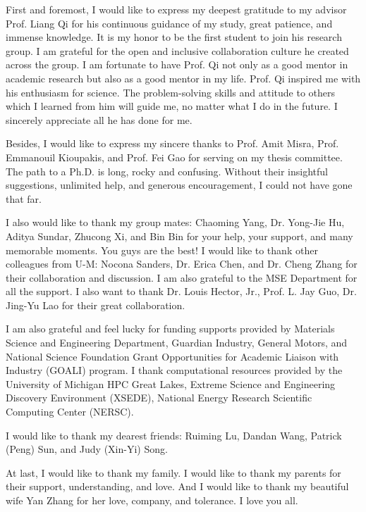 First and foremost, I would like to express my deepest gratitude to my advisor Prof. Liang Qi for his continuous guidance of my study, great patience, and immense knowledge. It is my honor to be the first student to join his research group. I am grateful for the open and inclusive collaboration culture he created across the group. I am fortunate to have Prof. Qi not only as a good mentor in academic research but also as a good mentor in my life. Prof. Qi inspired me with his enthusiasm for science. The problem-solving skills and attitude to others which I learned from him will guide me, no matter what I do in the future. I sincerely appreciate all he has done for me.

Besides, I would like to express my sincere thanks to Prof. Amit Misra, Prof. Emmanouil Kioupakis, and Prof. Fei Gao for serving on my thesis committee. The path to a Ph.D. is long, rocky and confusing. Without their insightful suggestions, unlimited help, and generous encouragement, I could not have gone that far.

I also would like to thank my group mates: Chaoming Yang, Dr. Yong-Jie Hu, Aditya Sundar, Zhucong Xi, and Bin Bin for your help, your support, and many memorable moments. You guys are the best! I would like to thank other colleagues from U-M: Nocona Sanders, Dr. Erica Chen, and Dr. Cheng Zhang for their collaboration and discussion. I am also grateful to the MSE Department for all the support. I also want to thank Dr. Louis Hector, Jr., Prof. L. Jay Guo, Dr. Jing-Yu Lao for their great collaboration. 

I am also grateful and feel lucky for funding supports provided by Materials Science and Engineering Department, Guardian Industry, General Motors, and National Science Foundation Grant Opportunities for Academic Liaison with Industry (GOALI) program. I thank computational resources provided by the University of Michigan HPC Great Lakes, Extreme Science and Engineering Discovery Environment (XSEDE),  National Energy Research Scientific Computing Center (NERSC).

I would like to thank my dearest friends: Ruiming Lu, Dandan Wang, Patrick (Peng) Sun, and Judy (Xin-Yi) Song.

At last, I would like to thank my family. I would like to thank my parents for their support, understanding, and love. And I would like to thank my beautiful wife Yan Zhang for her love, company, and tolerance. I love you all.